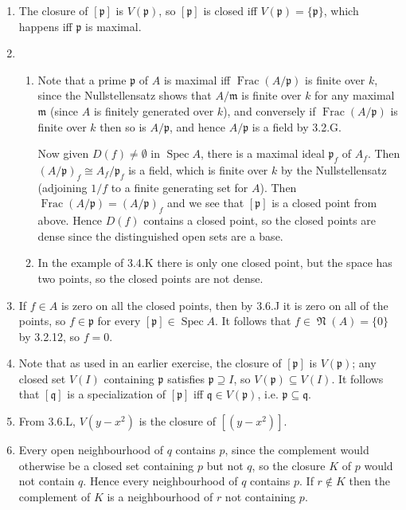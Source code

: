 \documentclass{report}
\newcommand{\m}{\mathfrak{m}}
\newcommand{\p}{\mathfrak{p}}
\newcommand{\q}{\mathfrak{q}}
\DeclareMathOperator{\Frac}{Frac}
\DeclareMathOperator{\Spec}{Spec}
\DeclareMathOperator{\nilrad}{\mathfrak{N}}
\begin{document}
\begin{enumerate}[label=\textbf{3.6.\Alph*.}]
	\item The closure of $[\p]$ is $V(\p)$, so $[\p]$ is closed iff
	      $V(\p)=\{\p\}$, which happens iff $\p$ is maximal.

	\item
	      \begin{enumerate}[label=(\alph*)]
		      \item Note that a prime $\p$ of $A$ is maximal iff $\Frac(A/\p)$
		            is finite over $k$, since the Nullstellensatz shows that
		            $A/\m$ is finite over $k$ for any maximal $\m$ (since $A$ is
		            finitely generated over $k$), and conversely if $\Frac(A/\p)$
		            is finite over $k$ then so is $A/\p$, and hence $A/\p$ is a
		            field by 3.2.G.

		            Now given $D(f)\ne\emptyset$ in $\Spec A$, there is a maximal
		            ideal $\p_f$ of $A_f$. Then $(A/\p)_f\cong A_f/\p_f$ is a
		            field, which is finite over $k$ by the Nullstellensatz
		            (adjoining $1/f$ to a finite generating set for $A$). Then
		            $\Frac(A/\p)=(A/\p)_f$ and we see that $[\p]$ is a closed
		            point from above. Hence $D(f)$ contains a closed point, so
		            the closed points are dense since the distinguished open
		            sets are a base.

		      \item In the example of 3.4.K there is only one closed point, but
		            the space has two points, so the closed points are not dense.
	      \end{enumerate}

	\item If $f\in A$ is zero on all the closed points, then by 3.6.J it is zero
	      on all of the points, so $f\in\p$ for every $[\p]\in\Spec A$. It follows
	      that $f\in\nilrad(A)=\{0\}$ by 3.2.12, so $f=0$.

	\item Note that as used in an earlier exercise, the closure of $[\p]$ is
	      $V(\p)$; any closed set $V(I)$ containing $\p$ satisfies $\p\supseteq I$,
	      so $V(\p)\subseteq V(I)$. It follows that $[\q]$ is a specialization of
	      $[\p]$ iff $\q\in V(\p)$, i.e. $\p\subseteq\q$.

	\item From 3.6.L, $V(y-x^2)$ is the closure of $[(y-x^2)]$.

	\item Every open neighbourhood of $q$ contains $p$, since the complement
	      would otherwise be a closed set containing $p$ but not $q$, so the
	      closure $K$ of $p$ would not contain $q$. Hence every neighbourhood of
	      $q$ contains $p$. If $r\notin K$ then the complement of $K$ is a
	      neighbourhood of $r$ not containing $p$.


\end{enumerate}
\end{document}

